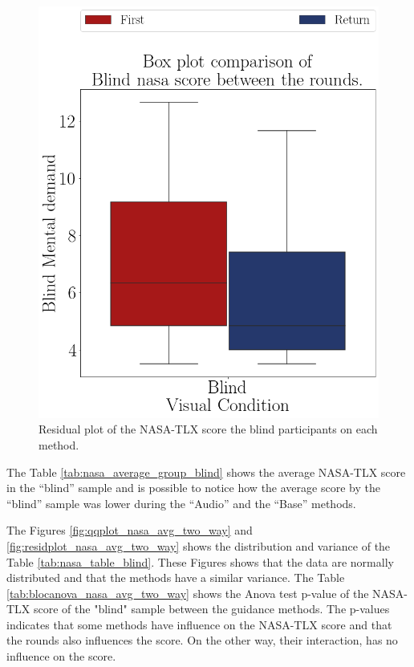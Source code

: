 \begin{figure}[!htb]
\begin{minipage}{0.45\textwidth}
        \includegraphics[width = 0.8\linewidth]{Resultados/Nasa/Figuras/png/boxplot_nasa_blind_rounds.png}
        \caption{Residual plot of the NASA-TLX score the blind participants on each method.}
        \label{fig:boxplot_nasa_blind_rounds}
    \end{minipage}
\end{figure}

The Table \ref{tab:nasa_average_group_blind} shows the average NASA-TLX score in the “blind” sample and is possible to notice how the average score by the “blind” sample was lower during the “Audio” and the “Base” methods.



The Figures \ref{fig:qqplot_nasa_avg_two_way} and \ref{fig:residplot_nasa_avg_two_way} shows the distribution and variance of the Table \ref{tab:nasa_table_blind}. These Figures shows that the data are normally distributed and that the methods have a similar variance.
The Table \ref{tab:blocanova_nasa_avg_two_way} shows the Anova test p-value of the NASA-TLX score of the "blind" sample between the guidance methods. The p-values indicates that some methods have influence on the NASA-TLX score and that the rounds also influences the score. On the other way, their interaction, has no influence on the score.



